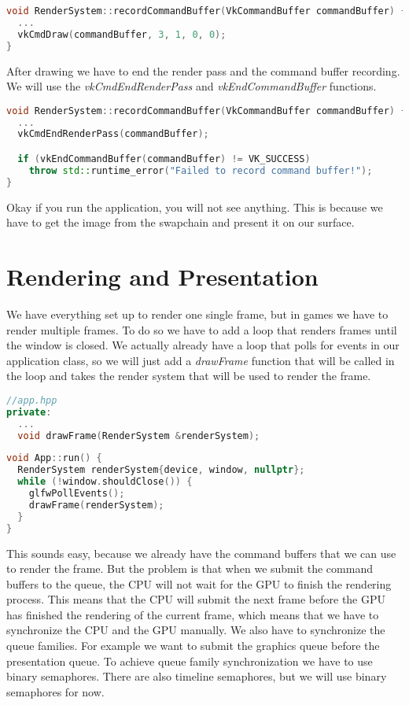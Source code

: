 \documentclass[12pt]{report} \usepackage{preamble}
\begin{document}
\begin{lstlisting}[language=C++]
void RenderSystem::recordCommandBuffer(VkCommandBuffer commandBuffer) {
  ...
  vkCmdDraw(commandBuffer, 3, 1, 0, 0);
}
\end{lstlisting}

After drawing we have to end the render pass and the command buffer recording. We will use the \textit{vkCmdEndRenderPass} and
\textit{vkEndCommandBuffer} functions.

\begin{lstlisting}[language=C++]
void RenderSystem::recordCommandBuffer(VkCommandBuffer commandBuffer) {
  ...
  vkCmdEndRenderPass(commandBuffer);

  if (vkEndCommandBuffer(commandBuffer) != VK_SUCCESS)
    throw std::runtime_error("Failed to record command buffer!");
}
\end{lstlisting}

Okay if you run the application, you will not see anything. This is because we have to get the image from the swapchain and
present it on our surface.

\section{Rendering and Presentation}

We have everything set up to render one single frame, but in games we have to render multiple frames. To do so we have to
add a loop that renders frames until the window is closed. We actually already have a loop that polls for events in our
application class, so we will just add a \textit{drawFrame} function that will be called in the loop and takes the
render system that will be used to render the frame.

\begin{lstlisting}[language=C++]
//app.hpp
private:
  ...
  void drawFrame(RenderSystem &renderSystem);
\end{lstlisting}

\begin{lstlisting}[language=C++]
void App::run() {
  RenderSystem renderSystem{device, window, nullptr};
  while (!window.shouldClose()) {
    glfwPollEvents();
    drawFrame(renderSystem);
  }
}
\end{lstlisting}

This sounds easy, because we already have the command buffers that we can use to render the frame. But the problem is that
when we submit the command buffers to the queue, the CPU will not wait for the GPU to finish the rendering process. This means that
the CPU will submit the next frame before the GPU has finished the rendering of the current frame, which means that we have
to synchronize the CPU and the GPU manually. We also have to synchronize the queue families. For example we want to submit the
graphics queue before the presentation queue. To achieve queue family synchronization we have to use binary semaphores. There are
also timeline semaphores, but we will use binary semaphores for now.
\end{document}
